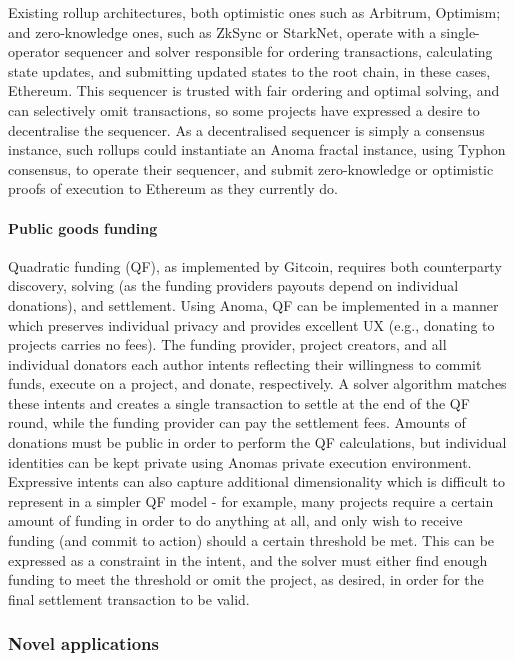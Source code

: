 Existing rollup architectures, both optimistic ones such as Arbitrum,
Optimism; and zero-knowledge ones, such as ZkSync or StarkNet, operate
with a single-operator sequencer and solver responsible for ordering
transactions, calculating state updates, and submitting updated states
to the root chain, in these cases, Ethereum. This sequencer is trusted
with fair ordering and optimal solving, and can selectively omit
transactions, so some projects have expressed a desire to decentralise
the sequencer. As a decentralised sequencer is simply a consensus
instance, such rollups could instantiate an Anoma fractal instance,
using Typhon consensus, to operate their sequencer, and submit
zero-knowledge or optimistic proofs of execution to Ethereum as they
currently do.

\paragraph{Public goods funding}\label{public-goods-funding}

Quadratic funding (QF), as implemented by Gitcoin, requires both
counterparty discovery, solving (as the funding
provider\textquotesingle s payouts depend on individual donations), and
settlement. Using Anoma, QF can be implemented in a manner which
preserves individual privacy and provides excellent UX (e.g., donating
to projects carries no fees). The funding provider, project creators,
and all individual donators each author intents reflecting their
willingness to commit funds, execute on a project, and donate,
respectively. A solver algorithm matches these intents and creates a
single transaction to settle at the end of the QF round, while the
funding provider can pay the settlement fees. Amounts of donations must
be public in order to perform the QF calculations, but individual
identities can be kept private using Anoma\textquotesingle s private
execution environment. Expressive intents can also capture additional
dimensionality which is difficult to represent in a simpler QF model -
for example, many projects require a certain amount of funding in order
to do anything at all, and only wish to receive funding (and commit to
action) should a certain threshold be met. This can be expressed as a
constraint in the intent, and the solver must either find enough funding
to meet the threshold or omit the project, as desired, in order for the
final settlement transaction to be valid.

\subsubsection{Novel applications}\label{novel-applications}

